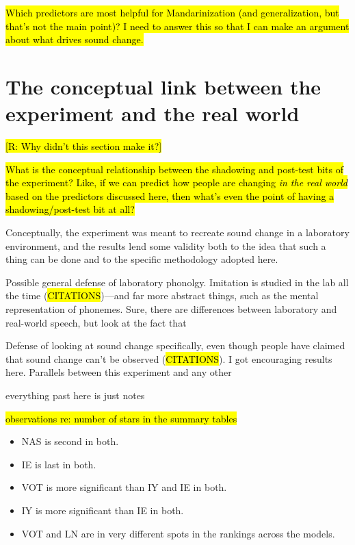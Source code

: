 \hl{Which predictors are most helpful for Mandarinization (and generalization, but that's not the main point)? I need to answer this so that I can make an argument about what drives sound change.}

\section{The conceptual link between the experiment and the real world}
\label{sec:conceptLinkExpIRL}

\hl{[R: Why didn't this section make it?]}

\hl{What is the conceptual relationship between the shadowing and post-test bits of the experiment? Like, if we can predict how people are changing \textit{in the real world} based on the predictors discussed here, then what's even the point of having a shadowing/post-test bit at all?}

Conceptually, the experiment was meant to recreate sound change in a laboratory environment, and the results lend some validity both to the idea that such a thing can be done and to the specific methodology adopted here.

Possible general defense of laboratory phonolgy. Imitation is studied in the lab all the time (\hl{CITATIONS})---and far more abstract things, such as the mental representation of phonemes. Sure, there are differences between laboratory and real-world speech, but look at the fact that 

Defense of looking at sound change specifically, even though people have claimed that sound change can't be observed (\hl{CITATIONS}). I got encouraging results here. Parallels between this experiment and any other 

\pagebreak

everything past here is just notes

\pagebreak

\hl{observations re: number of stars in the summary tables}
\begin{itemize}
    \item NAS is second in both.
    \item IE is last in both.
    \item VOT is more significant than IY and IE in both.
    \item IY is more significant than IE in both.
    \item VOT and LN are in very different spots in the rankings across the models.
\end{itemize}



